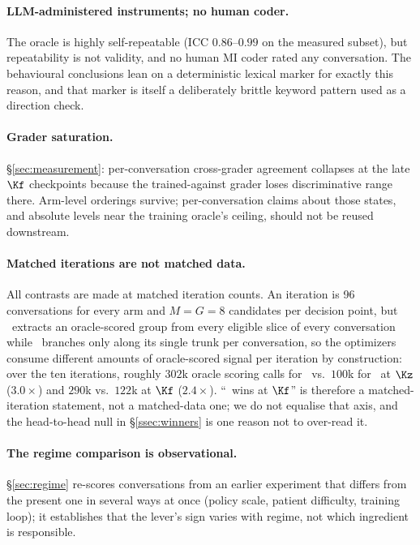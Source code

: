 \paragraph{LLM-administered instruments; no human coder.} The oracle is highly self-repeatable
(ICC $0.86$--$0.99$ on the measured subset), but repeatability is not validity, and no human MI
coder rated any conversation. The behavioural conclusions lean on a deterministic lexical marker
for exactly this reason, and that marker is itself a deliberately brittle keyword pattern used
as a direction check.

\paragraph{Grader saturation.} \S\ref{sec:measurement}: per-conversation cross-grader agreement
collapses at the late $\Kf$ checkpoints because the trained-against grader loses discriminative
range there. Arm-level orderings survive; per-conversation claims about those states, and
absolute levels near the training oracle's ceiling, should not be reused downstream.

\paragraph{Matched iterations are not matched data.} All contrasts are made at matched
iteration counts. An iteration is 96 conversations for every arm and $M{=}G{=}8$ candidates per
decision point, but \GRPO\ extracts an oracle-scored group from every eligible slice of every
conversation while \PTO\ branches only along its single trunk per conversation, so the
optimizers consume different amounts of oracle-scored signal per iteration by construction: over
the ten iterations, roughly $302$k oracle scoring calls for \GRPO\ vs.\ $100$k for \PTO\ at
$\Kz$ ($3.0\times$) and $290$k vs.\ $122$k at $\Kf$ ($2.4\times$). ``\GRPO\ wins at $\Kf$'' is
therefore a matched-iteration statement, not a matched-data one; we do not equalise that axis,
and the head-to-head null in \S\ref{ssec:winners} is one reason not to over-read it.

\paragraph{The regime comparison is observational.} \S\ref{sec:regime} re-scores conversations
from an earlier experiment that differs from the present one in several ways at once (policy
scale, patient difficulty, training loop); it establishes that the lever's sign varies with
regime, not which ingredient is responsible.
